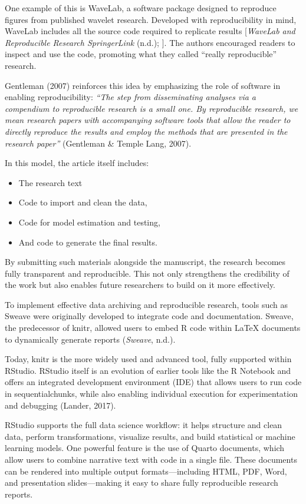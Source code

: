 \documentclass[
  a4paper,
]{article}
\begin{document}
One example of this is WaveLab, a software package designed to reproduce
figures from published wavelet research. Developed with reproducibility
in mind, WaveLab includes all the source code required to replicate
results {[}\emph{WaveLab and Reproducible Research \textbar{}
SpringerLink} (n.d.); {]}. The authors encouraged readers to inspect and
use the code, promoting what they called ``really reproducible''
research.

Gentleman (2007) reinforces this idea by emphasizing the role of
software in enabling reproducibility: \emph{``The step from
disseminating analyses via a compendium to reproducible research is a
small one. By reproducible research, we mean research papers with
accompanying software tools that allow the reader to directly reproduce
the results and employ the methods that are presented in the research
paper''} (Gentleman \& Temple Lang, 2007).

In this model, the article itself includes:

\begin{itemize}
\item
  The research text
\item
  Code to import and clean the data,
\item
  Code for model estimation and testing,
\item
  And code to generate the final results.
\end{itemize}

By submitting such materials alongside the manuscript, the research
becomes fully transparent and reproducible. This not only strengthens
the credibility of the work but also enables future researchers to build
on it more effectively.

To implement effective data archiving and reproducible research, tools
such as Sweave were originally developed to integrate code and
documentation. Sweave, the predecessor of knitr, allowed users to embed
R code within LaTeX documents to dynamically generate reports
(\emph{Sweave}, n.d.).

Today, knitr is the more widely used and advanced tool, fully supported
within RStudio. RStudio itself is an evolution of earlier tools like the
R Notebook and offers an integrated development environment (IDE) that
allows users to run code in sequentialchunks, while also enabling
individual execution for experimentation and debugging (Lander, 2017).

RStudio supports the full data science workflow: it helps structure and
clean data, perform transformations, visualize results, and build
statistical or machine learning models. One powerful feature is the use
of Quarto documents, which allow users to combine narrative text with
code in a single file. These documents can be rendered into multiple
output formats---including HTML, PDF, Word, and presentation
slides---making it easy to share fully reproducible research reports.
\end{document}

